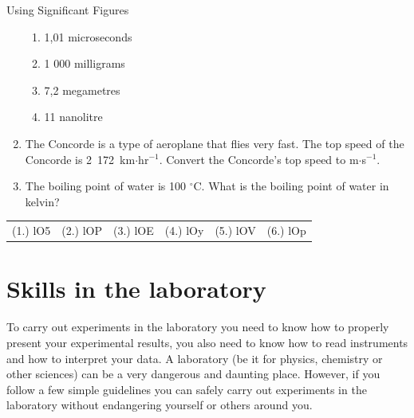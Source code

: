 \begin{exercises}{Using Significant Figures }
\begin{enumerate}[noitemsep, label=\textbf{\arabic*}. ]
\begin{enumerate}[noitemsep, label=\textbf{\alph*}. ]
  \item 1,01 microseconds
  \item 1 000 milligrams
  \item 7,2 megametres
  \item 11 nanolitre
  \end{enumerate}
  \item The Concorde is a type of aeroplane that flies very fast. The top speed of the Concorde is 2~172~km$\ensuremath{\cdot}$hr${}^{-1}$. Convert the Concorde's top speed to m$\ensuremath{\cdot}$s${}^{-1}$.        
  \item The boiling point of water is 100 ${}^{\circ }$C. What is the boiling point of water in kelvin?    
\end{enumerate}
\par \practiceinfo
 \par \begin{tabular}[h]{cccccc}
  (1.) lO5  &  (2.) lOP  &  (3.) lOE  &  (4.) lOy  &  (5.) lOV  &  (6.) lOp \end{tabular}
\end{exercises}

\section{Skills in the laboratory}
To carry out experiments in the laboratory you need to know how to properly present your experimental results, you also need to know how to read instruments and how to interpret your data. A laboratory (be it for physics, chemistry or other sciences) can be a very dangerous and daunting place. However, if you follow a few simple guidelines you can safely carry out experiments in the laboratory without endangering yourself or others around you.
